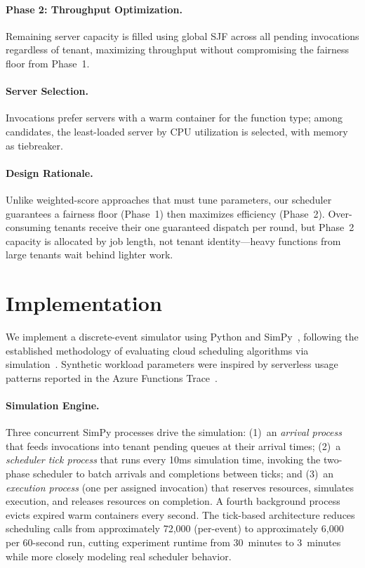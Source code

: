\documentclass[runningheads]{llncs}
\begin{document}
\paragraph{Phase 2: Throughput Optimization.}
Remaining server capacity is filled using global SJF across all pending invocations regardless of tenant, maximizing throughput without compromising the fairness floor from Phase~1.

\paragraph{Server Selection.}
Invocations prefer servers with a warm container for the function type; among candidates, the least-loaded server by CPU utilization is selected, with memory as tiebreaker.

\paragraph{Design Rationale.}
Unlike weighted-score approaches that must tune parameters, our scheduler guarantees a fairness floor (Phase~1) then maximizes efficiency (Phase~2). Over-consuming tenants receive their one guaranteed dispatch per round, but Phase~2 capacity is allocated by job length, not tenant identity---heavy functions from large tenants wait behind lighter work.

\section{Implementation}\label{sec:implementation}

We implement a discrete-event simulator using Python and SimPy~\cite{mueller2024simpy}, following the established methodology of evaluating cloud scheduling algorithms via simulation~\cite{calheiros2011cloudsim}. Synthetic workload parameters were inspired by serverless usage patterns reported in the Azure Functions Trace~\cite{shahrad2020serverless}.

\paragraph{Simulation Engine.}
Three concurrent SimPy processes drive the simulation: (1)~an \emph{arrival process} that feeds invocations into tenant pending queues at their arrival times; (2)~a \emph{scheduler tick process} that runs every 10ms simulation time, invoking the two-phase scheduler to batch arrivals and completions between ticks; and (3)~an \emph{execution process} (one per assigned invocation) that reserves resources, simulates execution, and releases resources on completion. A fourth background process evicts expired warm containers every second. The tick-based architecture reduces scheduling calls from approximately 72,000 (per-event) to approximately 6,000 per 60-second run, cutting experiment runtime from 30~minutes to 3~minutes while more closely modeling real scheduler behavior.
\end{document}
